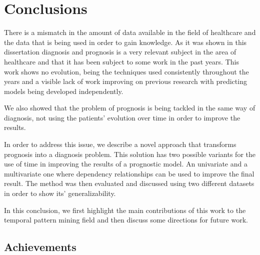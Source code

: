 
\chapter{Conclusions}
\label{chapter:conclusions}

There is a mismatch in the amount of data available in the field of healthcare and the data that is being used in order to gain knowledge.
 As it was shown in this dissertation diagnosis and prognosis is a very relevant subject in the area of healthcare and that it has been subject 
 to some work in the past years. This work shows no evolution, being the techniques used consistently throughout the years and a visible
 lack of work improving on previous research with predicting models being developed independently. 

We also showed that the problem of prognosis is being tackled in the same way of diagnosis, not using the patients’ evolution over time
 in order to improve the results. 

In order to address this issue, we describe a novel approach that transforms prognosis into a diagnosis problem. This solution has two possible variants for the use of time in improving the results of a prognostic model. An univariate and a multivariate one where dependency relationships can be used to improve the final result.
The method was then evaluated and discussed using two different datasets in order to show its’ generalizability.

In this conclusion, we first highlight the main contributions of this work to the temporal pattern mining field and then discuss some directions for future work.

\section{Achievements}
\label{section:achievements}

